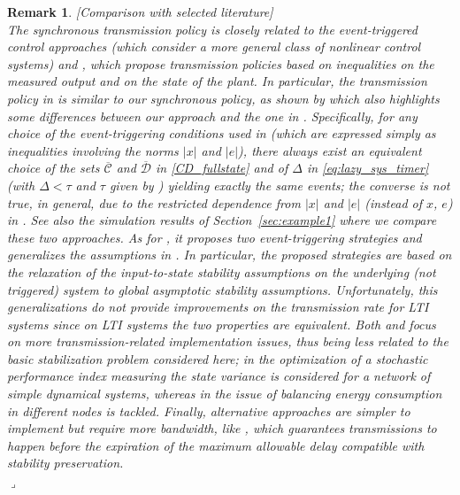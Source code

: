 \documentclass[twocolumn]{autart}
\newtheorem{remm}{Remark}
\newenvironment{remark}{\begin{remm}\rm }{\hfill \hspace*{1pt} \hfill $\lrcorner$\end{remm}}
\begin{document}
{
\begin{remark}[\emph{Comparison with selected literature}] \\
The synchronous transmission policy is closely related to the
event-triggered control approaches 
\cite{Anta08,Anta10,Seuret11,Tabuada07,Wang08a} (which consider a more 
general class of nonlinear control systems) and \cite{Cervin08,Mazo08},
which propose transmission policies based on inequalities on the
measured output and on the state of the plant.
In particular, the transmission policy in \cite[Section IV]{Tabuada07} 
is similar to our synchronous policy, as shown by \cite[Equation (13)]{Tabuada07}
which also highlights some differences between our approach and the one in \cite{Tabuada07}. 
Specifically, for any choice of the event-triggering conditions used in \cite{Tabuada07} 
(which are expressed simply as inequalities involving the norms $|x|$ and $|e|$),
there always exist an equivalent choice of the sets $\overline{\mathcal{C}}$ 
and $\overline{\mathcal{D}}$ in \eqref{CD_fullstate} and of $\Delta$ in \eqref{eq:lazy_sys_timer}
(with $\Delta<\tau$ and $\tau$ given by \cite[Corollary IV.1]{Tabuada07}) yielding exactly the same events;
the converse is not true, in general, due to the restricted dependence from $|x|$ and $|e|$
(instead of $x$, $e$) in \cite{Tabuada07}. { See also the simulation results of Section~\ref{sec:example1} 
where we compare these two approaches.}
As for \cite{Seuret11}, it proposes two event-triggering strategies and generalizes the 
assumptions in \cite{Anta08,Anta10,Tabuada07,Wang08a}.
In particular, the proposed strategies are based on the  
relaxation of the input-to-state stability assumptions on the underlying (not triggered) system
to global asymptotic stability assumptions. Unfortunately, this generalizations
do not provide improvements on the transmission rate for LTI systems since 
on LTI systems the two properties are equivalent.
Both \cite{Cervin08} and \cite{Mazo08} focus on more transmission-related implementation issues,
thus being less related to the basic stabilization problem considered here;
in \cite{Cervin08} the optimization of a stochastic performance index 
measuring the state variance is considered 
for a network of simple dynamical systems, whereas in \cite{Mazo08}
the issue of balancing energy consumption in different nodes is tackled.
Finally, alternative approaches are simpler to implement but require more bandwidth,
like \cite{Carnevale07}, which guarantees transmissions to happen 
before the expiration of the maximum allowable delay compatible with stability preservation.


\end{remark}}
\end{document}
